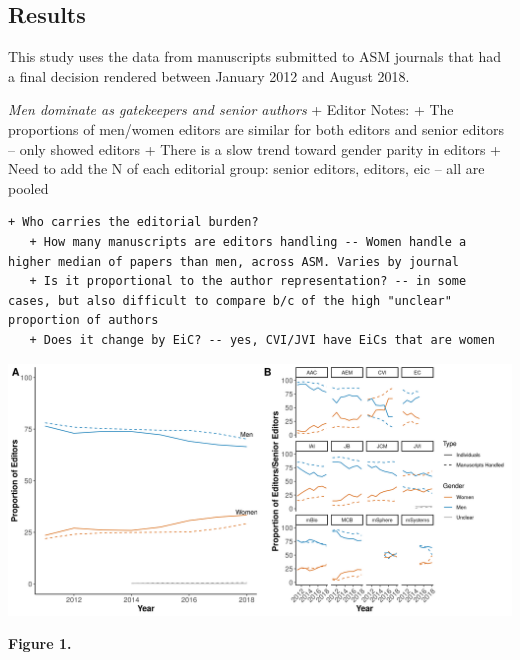 \documentclass[11pt,]{article}
\begin{document}
\subsection{Results}\label{results}

This study uses the data from manuscripts submitted to ASM journals that
had a final decision rendered between January 2012 and August 2018.

\emph{Men dominate as gatekeepers and senior authors} + Editor Notes: +
The proportions of men/women editors are similar for both editors and
senior editors -- only showed editors + There is a slow trend toward
gender parity in editors + Need to add the N of each editorial group:
senior editors, editors, eic -- all are pooled

\begin{verbatim}
+ Who carries the editorial burden?
   + How many manuscripts are editors handling -- Women handle a higher median of papers than men, across ASM. Varies by journal
   + Is it proportional to the author representation? -- in some cases, but also difficult to compare b/c of the high "unclear" proportion of authors
   + Does it change by EiC? -- yes, CVI/JVI have EiCs that are women
\end{verbatim}

\includegraphics{Figure_1.png}

\textbf{Figure 1.}
\end{document}
